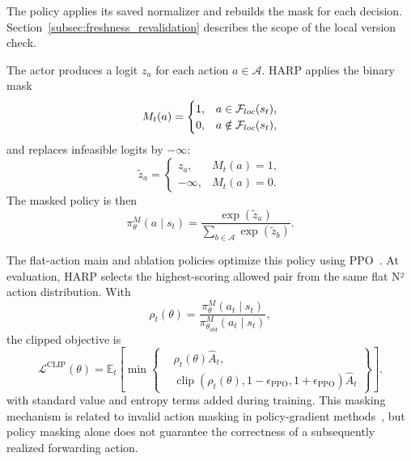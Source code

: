 \documentclass[final,5p]{elsarticle}
\newcommand{\rev}[1]{\textcolor{revisiongreen}{#1}}
\let\newrev\rev
\begin{document}
\newrev{The policy applies its saved normalizer and rebuilds the mask for each decision. Section~\ref{subsec:freshness_revalidation} describes the scope of the local version check.}

The actor produces a logit \(z_a\) for each action \(a\in\mathcal{A}\). HARP applies the binary mask
\begin{equation}
M_t(a)=
\begin{cases}
1, & \rev{a\in\mathcal{F}_{loc}(s_t)},\\
0, & \rev{a\notin\mathcal{F}_{loc}(s_t)},
\end{cases}
\end{equation}
and replaces infeasible logits by \(-\infty\):
\begin{equation}
\tilde{z}_a=
\begin{cases}
z_a, & M_t(a)=1,\\
-\infty, & M_t(a)=0.
\end{cases}
\end{equation}
The masked policy is then
\begin{equation}
\pi_\theta^{M}(a\mid s_t)=\frac{\exp(\tilde{z}_a)}{\sum_{b\in\mathcal{A}}\exp(\tilde{z}_b)}.
\end{equation}

\sloppy
\newrev{The flat-action main and ablation policies optimize this policy using PPO~\cite{schulman2017proximal}. At evaluation, HARP selects the highest-scoring allowed pair from the same flat N² action distribution.} With
\begin{equation}
    \rho_t(\theta)=
    \frac{\pi_\theta^{M}(a_t\mid s_t)}
    {\pi_{\theta_{old}}^{M}(a_t\mid s_t)},
\end{equation}
the clipped objective is
\begin{equation} \label{eq:ppo_clip} \mathcal{L}^{\mathrm{CLIP}}(\theta) = \mathbb{E}_t \left[ \min \left\{ \begin{aligned} &\rho_t(\theta)\hat{A}_t,\\ &\operatorname{clip}\!\left( \rho_t(\theta), 1-\epsilon_{\mathrm{PPO}}, 1+\epsilon_{\mathrm{PPO}} \right)\hat{A}_t \end{aligned} \right\} \right]. \end{equation}
with standard value and entropy terms added during training. This masking mechanism is related to invalid action masking in policy-gradient methods~\cite{huang2022closer}, \rev{but policy masking alone does not guarantee the correctness of a subsequently realized forwarding action}.
\end{document}
